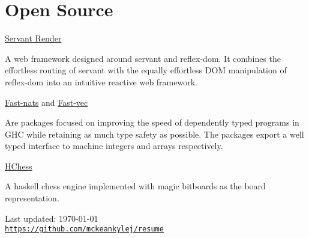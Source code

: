 \documentclass[letterpaper]{article}
\def\footerlink{https://github.com/mckeankylej/resume}
\renewenvironment{itemize}{
  \begin{list}{}{
    \setlength{\leftmargin}{1.5em}
  }
}{
  \end{list}
}
\begin{document}
\section*{Open Source}

\begin{itemize}
    \item \href{https://github.com/mckeankylej/servant-render}{Servant Render}
    \begin{itemize}
        \item \textbullet{} A web framework designed around servant and reflex-dom. It combines the effortless routing of servant with the equally effortless DOM manipulation of reflex-dom into an intuitive reactive web framework. 
    \end{itemize}
    \item \href{https://github.com/mckeankylej/fast-nats}{Fast-nats} and      \href{https://github.com/mckeankylej/fast-vec}{Fast-vec}
    \begin{itemize}
        \item \textbullet{} Are packages focused on improving the speed of dependently typed programs in GHC while retaining as much type safety as possible. The packages export a well typed interface to machine integers and arrays respectively.
    \end{itemize}
    \item \href{https://github.com/mckeankylej/hchess}{HChess} 
    \begin{itemize}
        \item \textbullet{} A  haskell chess engine implemented with magic bitboards as the board representation.
    \end{itemize}
\end{itemize}

\bigskip

\begin{center}
  \begin{footnotesize}
    Last updated: \today \\
    \href{\footerlink}{\texttt{\footerlink}}
  \end{footnotesize}
\end{center}
\end{document}
